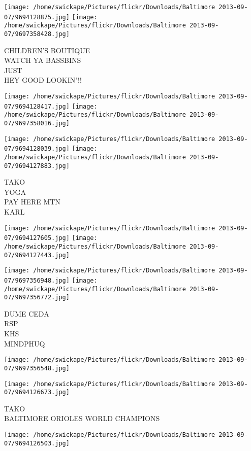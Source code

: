 \documentclass[10pt,letterpaper]{article}
\begin{document}
\texttt{[image: /home/swickape/Pictures/flickr/Downloads/Baltimore 2013-09-07/9694128875.jpg]}
\texttt{[image: /home/swickape/Pictures/flickr/Downloads/Baltimore 2013-09-07/9697358428.jpg]}

CHILDREN'S BOUTIQUE\\
WATCH YA BASSBINS\\
JUST\\
HEY GOOD LOOKIN'!!
\pagebreak

\texttt{[image: /home/swickape/Pictures/flickr/Downloads/Baltimore 2013-09-07/9694128417.jpg]}
\texttt{[image: /home/swickape/Pictures/flickr/Downloads/Baltimore 2013-09-07/9697358016.jpg]}

\texttt{[image: /home/swickape/Pictures/flickr/Downloads/Baltimore 2013-09-07/9694128039.jpg]}
\texttt{[image: /home/swickape/Pictures/flickr/Downloads/Baltimore 2013-09-07/9694127883.jpg]}

TAKO\\
YOGA\\
PAY HERE MTN\\
KARL
\pagebreak

\texttt{[image: /home/swickape/Pictures/flickr/Downloads/Baltimore 2013-09-07/9694127605.jpg]}
\texttt{[image: /home/swickape/Pictures/flickr/Downloads/Baltimore 2013-09-07/9694127443.jpg]}

\texttt{[image: /home/swickape/Pictures/flickr/Downloads/Baltimore 2013-09-07/9697356948.jpg]}
\texttt{[image: /home/swickape/Pictures/flickr/Downloads/Baltimore 2013-09-07/9697356772.jpg]}

DUME CEDA\\
RSP\\
KHS\\
MINDPHUQ
\pagebreak

\texttt{[image: /home/swickape/Pictures/flickr/Downloads/Baltimore 2013-09-07/9697356548.jpg]}

\vspace{0.25in}
\texttt{[image: /home/swickape/Pictures/flickr/Downloads/Baltimore 2013-09-07/9694126673.jpg]}

TAKO\\
BALTIMORE ORIOLES WORLD CHAMPIONS
\pagebreak

\texttt{[image: /home/swickape/Pictures/flickr/Downloads/Baltimore 2013-09-07/9694126503.jpg]}
\end{document}
